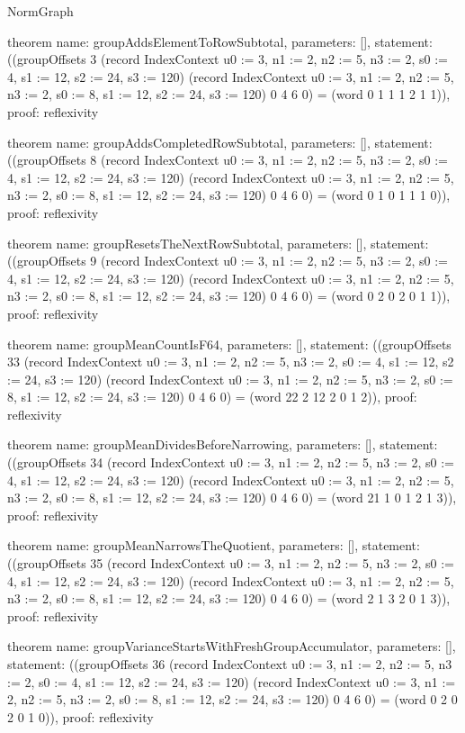 \begin{lexlean}{NormGraph}
\begin{semanticmodule}
theorem{
  name: groupAddsElementToRowSubtotal,
  parameters: [],
  statement: ((groupOffsets 3 (record IndexContext {u0 := 3, n1 := 2, n2 := 5, n3 := 2, s0 := 4, s1 := 12, s2 := 24, s3 := 120}) (record IndexContext {u0 := 3, n1 := 2, n2 := 5, n3 := 2, s0 := 8, s1 := 12, s2 := 24, s3 := 120}) 0 4 6 0) = (word 0 1 1 1 2 1 1)),
  proof: reflexivity{}
}

theorem{
  name: groupAddsCompletedRowSubtotal,
  parameters: [],
  statement: ((groupOffsets 8 (record IndexContext {u0 := 3, n1 := 2, n2 := 5, n3 := 2, s0 := 4, s1 := 12, s2 := 24, s3 := 120}) (record IndexContext {u0 := 3, n1 := 2, n2 := 5, n3 := 2, s0 := 8, s1 := 12, s2 := 24, s3 := 120}) 0 4 6 0) = (word 0 1 0 1 1 1 0)),
  proof: reflexivity{}
}

theorem{
  name: groupResetsTheNextRowSubtotal,
  parameters: [],
  statement: ((groupOffsets 9 (record IndexContext {u0 := 3, n1 := 2, n2 := 5, n3 := 2, s0 := 4, s1 := 12, s2 := 24, s3 := 120}) (record IndexContext {u0 := 3, n1 := 2, n2 := 5, n3 := 2, s0 := 8, s1 := 12, s2 := 24, s3 := 120}) 0 4 6 0) = (word 0 2 0 2 0 1 1)),
  proof: reflexivity{}
}

theorem{
  name: groupMeanCountIsF64,
  parameters: [],
  statement: ((groupOffsets 33 (record IndexContext {u0 := 3, n1 := 2, n2 := 5, n3 := 2, s0 := 4, s1 := 12, s2 := 24, s3 := 120}) (record IndexContext {u0 := 3, n1 := 2, n2 := 5, n3 := 2, s0 := 8, s1 := 12, s2 := 24, s3 := 120}) 0 4 6 0) = (word 22 2 12 2 0 1 2)),
  proof: reflexivity{}
}

theorem{
  name: groupMeanDividesBeforeNarrowing,
  parameters: [],
  statement: ((groupOffsets 34 (record IndexContext {u0 := 3, n1 := 2, n2 := 5, n3 := 2, s0 := 4, s1 := 12, s2 := 24, s3 := 120}) (record IndexContext {u0 := 3, n1 := 2, n2 := 5, n3 := 2, s0 := 8, s1 := 12, s2 := 24, s3 := 120}) 0 4 6 0) = (word 21 1 0 1 2 1 3)),
  proof: reflexivity{}
}

theorem{
  name: groupMeanNarrowsTheQuotient,
  parameters: [],
  statement: ((groupOffsets 35 (record IndexContext {u0 := 3, n1 := 2, n2 := 5, n3 := 2, s0 := 4, s1 := 12, s2 := 24, s3 := 120}) (record IndexContext {u0 := 3, n1 := 2, n2 := 5, n3 := 2, s0 := 8, s1 := 12, s2 := 24, s3 := 120}) 0 4 6 0) = (word 2 1 3 2 0 1 3)),
  proof: reflexivity{}
}

theorem{
  name: groupVarianceStartsWithFreshGroupAccumulator,
  parameters: [],
  statement: ((groupOffsets 36 (record IndexContext {u0 := 3, n1 := 2, n2 := 5, n3 := 2, s0 := 4, s1 := 12, s2 := 24, s3 := 120}) (record IndexContext {u0 := 3, n1 := 2, n2 := 5, n3 := 2, s0 := 8, s1 := 12, s2 := 24, s3 := 120}) 0 4 6 0) = (word 0 2 0 2 0 1 0)),
  proof: reflexivity{}
}


\end{semanticmodule}
\end{lexlean}
